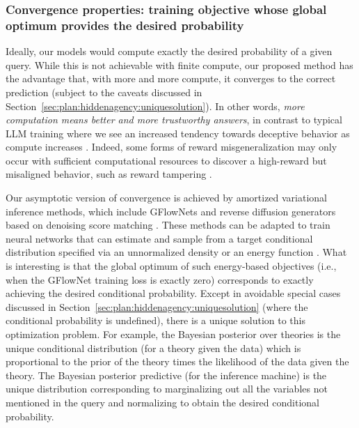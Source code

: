 \subsubsection{Convergence properties: training objective whose global optimum provides the desired probability}
\label{sec:plan:inferencemachine:convergence}

Ideally, our models would compute exactly the desired probability of a given query. While this is not achievable with finite compute, our proposed method has the advantage that, with more and more compute, it converges to the correct prediction (subject to the caveats discussed in Section~\ref{sec:plan:hiddenagency:uniquesolution}). In other words, \emph{more computation means better and more trustworthy answers}, in contrast to typical LLM training where we see an increased tendency towards deceptive behavior as compute increases \cite{arxiv.org.abs.2412.14093}. Indeed, some forms of reward misgeneralization may only occur with sufficient computational resources to discover a high-reward but misaligned behavior, such as reward tampering \cite{ojs.aaai.org.aimagazine.index.php.aimagazine.article.view.15084}.

Our asymptotic version of convergence is achieved by amortized variational inference methods, which include GFlowNets \cite{pubs.rsc.org.en.content.articlehtml.2023.dd.d3dd00002h, openreview.net.forum.id.uKiE0VIluA} and reverse diffusion generators \cite{proceedings.mlr.press.v37.sohl.dickstein15.html, proceedings.neurips.cc.paper.2020.hash.4c5bcfec8584af0d967f1ab10179ca4b.Abstract.html} based on denoising score matching \cite{ieeexplore.ieee.org.abstract.document.6795935}. These methods can be adapted to train neural networks that can estimate and sample from a target conditional distribution specified via an unnormalized density or an energy function \cite{openreview.net.forum.id..uCb2ynRu7Y, openreview.net.forum.id.8pvnfTAbu1f, openreview.net.forum.id.gVjMwLDFoQ}. What is interesting is that the global optimum of such energy-based objectives (i.e., when the GFlowNet training loss is exactly zero) corresponds to exactly achieving the desired conditional probability. Except in avoidable special cases discussed in Section~\ref{sec:plan:hiddenagency:uniquesolution} (where the conditional probability is undefined), there is a unique solution to this optimization problem. For example, the Bayesian posterior over theories is the unique conditional distribution (for a theory given the data) which is proportional to the prior of the theory times the likelihood of the data given the theory. The Bayesian posterior predictive (for the inference machine) is the unique distribution corresponding to marginalizing out all the variables not mentioned in the query and normalizing to obtain the desired conditional probability.

